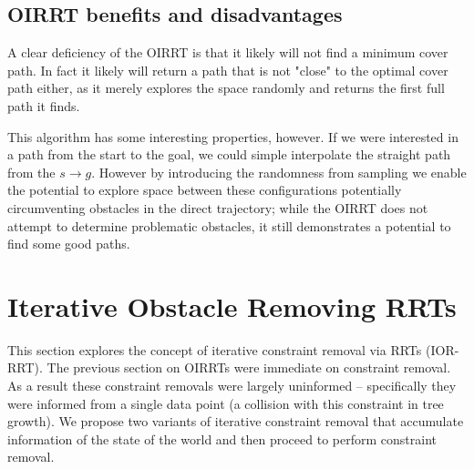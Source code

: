 \subsection{OIRRT benefits and disadvantages}
A clear deficiency of the OIRRT is that it likely will not find a minimum cover path. In fact it likely will return a path that is not "close" to the optimal cover path either, as it merely explores the space randomly and returns the first full path it finds.

This algorithm has some interesting properties, however. If we were interested in a path from the start to the goal, we could simple interpolate the straight path from the $s \rightarrow g$. However by introducing the randomness from sampling we enable the potential to explore space between these configurations potentially circumventing obstacles in the direct trajectory; while the OIRRT does not attempt to determine problematic obstacles, it still demonstrates a potential to find some good paths.

\section{Iterative Obstacle Removing RRTs}
This section explores the concept of iterative constraint removal via RRTs (IOR-RRT). The previous section on OIRRTs were immediate on constraint removal. As a result these constraint removals were largely uninformed -- specifically they were informed from a single data point (a collision with this constraint in tree growth). We propose two variants of iterative constraint removal that accumulate information of the state of the world and then proceed to perform constraint removal.

